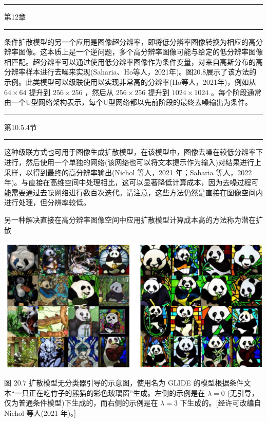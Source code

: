 \documentclass[10pt]{article}
\newcommand{\HRule}{\begin{center}\rule{0.9\linewidth}{0.2mm}\end{center}}
\begin{document}
\HRule

第12章

\HRule

条件扩散模型的另一个应用是图像超分辨率，即将低分辨率图像转换为相应的高分辨率图像。这本质上是一个逆问题，多个高分辨率图像可能与给定的低分辨率图像相匹配。超分辨率可以通过使用低分辨率图像作为条件变量，对来自高斯分布的高分辨率样本进行去噪来实现(Saharia、Ho等人，2021年)。图20.8展示了该方法的示例。此类模型可以级联使用以实现非常高的分辨率(Ho等人，2021年)，例如从 \({64} \times  {64}\) 提升到 \({256} \times  {256}\) ，然后从 \({256} \times  {256}\) 提升到 \({1024} \times  {1024}\) 。每个阶段通常由一个U型网络架构表示，每个U型网络都以先前阶段的最终去噪输出为条件。

\HRule

第10.5.4节

\HRule

这种级联方式也可用于图像生成扩散模型，在该模型中，图像去噪在较低分辨率下进行，然后使用一个单独的网络(该网络也可以将文本提示作为输入)对结果进行上采样，以得到最终的高分辨率输出(Nichol 等人，2021 年；Saharia 等人，2022 年)。与直接在高维空间中处理相比，这可以显著降低计算成本，因为去噪过程可能需要通过去噪网络进行数百次迭代。请注意，这些方法仍然是直接在图像空间内进行处理，但分辨率较低。

另一种解决直接在高分辨率图像空间中应用扩散模型计算成本高的方法称为潜在扩散

\begin{center}
\includegraphics[max width=1.0\textwidth]{images/0194e279-9b28-703a-88f4-c3ac21e2010d_621_217_343_1356_661_0.jpg}
\end{center}
\hspace*{3em} 

图 20.7 扩散模型无分类器引导的示意图，使用名为 GLIDE 的模型根据条件文本“一只正在吃竹子的熊猫的彩色玻璃窗”生成。左侧的示例是在 \(\lambda  = 0\) (无引导，仅为普通条件模型)下生成的，而右侧的示例是在 \(\lambda  = 3\) 下生成的。[经许可改编自 Nichol 等人(2021 年)。]
\end{document}
